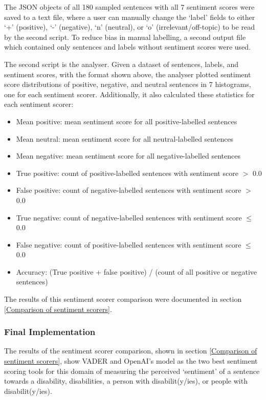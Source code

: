\documentclass{report}
\begin{document}
The JSON objects of all 180 sampled sentences with all 7 sentiment scores were saved to a text file, where a user can manually change the `label' fields to either `+' (positive), `-' (negative), `n' (neutral), or `o' (irrelevant/off-topic) to be read by the second script.
To reduce bias in manual labelling, a second output file which contained only sentences and labels without sentiment scores were used.

The second script is the analyser.
Given a dataset of sentences, labels, and sentiment scores, with the format shown above, the analyser plotted sentiment score distributions of positive, negative, and neutral sentences in 7 histograms, one for each sentiment scorer.
Additionally, it also calculated these statistics for each sentiment scorer:
\begin{itemize}
	\item Mean positive: mean sentiment score for all positive-labelled sentences
	\item Mean neutral: mean sentiment score for all neutral-labelled sentences
	\item Mean negative: mean sentiment score for all negative-labelled sentences
	\item True positive: count of positive-labelled sentences with sentiment score $>$ 0.0
	\item False positive: count of negative-labelled sentences with sentiment score $>$ 0.0 
	\item True negative: count of negative-labelled sentences with sentiment score $\le$ 0.0
	\item False negative: count of positive-labelled sentences with sentiment score $\le$ 0.0
	\item Accuracy: (True positive + false positive) / (count of all positive or negative sentences)
\end{itemize}

The results of this sentiment scorer comparison were documented in section \ref{Comparison of sentiment scorers}.

\subsubsection{Final Implementation} \label{des-sentiment-final}

The results of the sentiment scorer comparison, shown in section \ref{Comparison of sentiment scorers}, show VADER \cite{VADER} and OpenAI's model \cite{OpenAI} as the two best sentiment scoring tools for this domain of measuring the perceived `sentiment' of a sentence towards a disability, disabilities, a person with disabilit(y/ies), or people with disabilit(y/ies).
\end{document}
